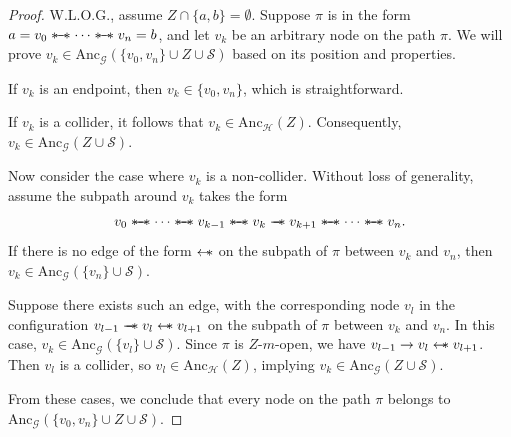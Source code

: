 \documentclass[accepted]{uai2025} %
\newcommand{\anc}{\text{Anc}}
\newcommand{\hus}{\mathrel{{\leftarrow\mkern-11mu\ast}}}
\newcommand{\tus}{\mathrel{{\relbar\mkern-11mu\relbar\mkern-11mu\ast}}}
\newcommand{\sus}{\mathrel{{\ast\mkern-11mu\relbar\mkern-9mu\relbar\mkern-11mu\ast}}}
\begin{document}
\lemmaseventeena*
\begin{proof}
W.L.O.G., assume $Z\cap\{a,b\}=\emptyset$. Suppose $\pi$ is in the form $a=v_0\sus\cdots\sus v_n=b$, and let \( v_k \) be an arbitrary node on the path \(\pi\). We will prove \( v_k \in \anc_\mathcal{G}(\{v_0, v_n\} \cup Z \cup \mathcal{S}) \) based on its position and properties.

If \( v_k \) is an endpoint, then \( v_k \in \{v_0, v_n\} \), which is straightforward.

If \( v_k \) is a collider, it follows that \( v_k \in \anc_\mathcal{H}(Z) \). Consequently, \( v_k \in \anc_\mathcal{G}(Z \cup \mathcal{S}) \).

Now consider the case where \( v_k \) is a non-collider. Without loss of generality, assume the subpath around \( v_k \) takes the form 
\[
v_0\sus \cdots\sus  v_{k-1}\sus v_k\tus v_{k+1}\sus \cdots\sus  v_n.
\]
If there is no edge of the form \(\hus\) on the subpath of \(\pi\) between \( v_k \) and \( v_n \), then \( v_k \in \anc_\mathcal{G}(\{v_n\} \cup \mathcal{S}) \).

Suppose there exists such an edge, with the corresponding node \( v_l \) in the configuration \( v_{l-1}\tus v_l\hus v_{l+1} \) on the subpath of \(\pi\) between \( v_k \) and \( v_n \). In this case, \( v_k \in \anc_\mathcal{G}(\{v_l\} \cup \mathcal{S}) \). Since \(\pi\) is \( Z \)-$m$-open, we have \( v_{l-1}\rightarrow v_l\hus v_{l+1} \). Then \( v_l \) is a collider, so \( v_l \in \anc_\mathcal{H}(Z) \), implying \( v_k \in \anc_\mathcal{G}(Z \cup \mathcal{S}) \).

From these cases, we conclude that every node on the path \(\pi\) belongs to \( \anc_\mathcal{G}(\{v_0, v_n\} \cup Z \cup \mathcal{S}) \).
\end{proof}
\end{document}
